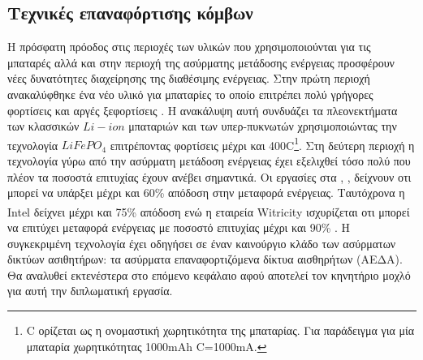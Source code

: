 \subsection{Τεχνικές επαναφόρτισης κόμβων}
Η πρόσφατη πρόοδος στις περιοχές των υλικών που χρησιμοποιούνται για τις μπαταρές αλλά και στην περιοχή της ασύρματης μετάδοσης ενέργειας προσφέρουν νέες δυνατότητες
διαχείρησης της διαθέσιμης ενέργειας. Στην πρώτη περιοχή ανακαλύφθηκε ένα νέο υλικό για μπαταρίες το οποίο επιτρέπει πολύ γρήγορες φορτίσεις και αργές ξεφορτίσεις
\cite{fast_recharging}. Η ανακάλυψη αυτή συνδυάζει τα πλεονεκτήματα των κλασσικών $Li-ion$ μπαταριών και των υπερ-πυκνωτών χρησιμοποιώντας την τεχνολογία
$LiFePO_{4}$ επιτρέποντας φορτίσεις μέχρι και 400C\footnote{C ορίζεται ως η ονομαστική χωρητικότητα της μπαταρίας. Για παράδειγμα για μία
μπαταρία χωρητικότητας 1000mAh C=1000mA.}. Στη δεύτερη περιοχή η τεχνολογία γύρω από την ασύρματη μετάδοση ενέργειας έχει εξελιχθεί τόσο πολύ που πλέον τα ποσοστά
επιτυχίας έχουν ανέβει σημαντικά. Οι εργασίες στα \cite{wireless_recharg1}, \cite{wireless_recharg2}, \cite{wireless_recharg3} δείχνουν οτι μπορεί να υπάρξει μέχρι
και 60\% απόδοση στην μεταφορά ενέργειας. Ταυτόχρονα η Intel\textsuperscript{\textregistered} δείχνει μέχρι και 75\% απόδοση \cite{intel_recharg} ενώ η εταιρεία
Witricity\textsuperscript{\textregistered} ισχυρίζεται οτι μπορεί να επιτύχει μεταφορά ενέργειας με ποσοστό επιτυχίας μέχρι και 90\% \cite{witricity_90}. Η
συγκεκριμένη τεχνολογία έχει οδηγήσει σε έναν καινούργιο κλάδο των ασύρματων δικτύων ασιθητήρων: τα ασύρματα επαναφορτιζόμενα δίκτυα αισθηρήτων (ΑΕΔΑ). Θα αναλυθεί
εκτενέστερα στο επόμενο κεφάλαιο αφού αποτελεί τον κηνητήριο μοχλό για αυτή την διπλωματική εργασία.
























